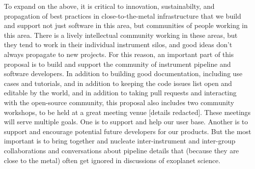 \documentclass[12pt]{article}
\begin{document}

To expand on the above, it is critical to innovation, sustainabilty, and propagation of best practices in close-to-the-metal infrastructure that we build and support not just software in this area, but communities of people working in this area.
There is a lively intellectual community working in these areas, but they tend to work in their individual instrument silos, and good ideas don't always propagate to new projects.
For this reason, an important part of this proposal is to build and support the community of instrument pipeline and software developers.
In addition to building good documentation, including use cases and tutorials, and in addition to keeping the code issues list open and editable by the world, and in addition to taking pull requests and interacting with the open-source community, this proposal also includes two community workshops, to be held at a great meeting venue [details redacted].
These meetings will serve multiple goals.
One is to support and help our user base.
Another is to support and encourage potential future developers for our products.
But the most important is to bring together and nucleate inter-instrument and inter-group collaborations and conversations about pipeline details that (because they are close to the metal) often get ignored in discussions of exoplanet science.
\end{document}
